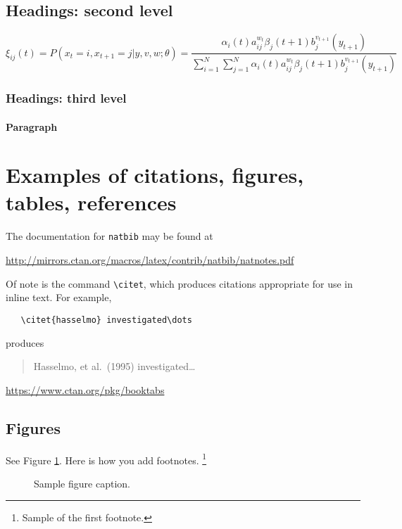 \documentclass{article}
\begin{document}
\subsection{Headings: second level}
\lipsum[5]
\begin{equation}
\xi _{ij}(t)=P(x_{t}=i,x_{t+1}=j|y,v,w;\theta)= {\frac {\alpha _{i}(t)a^{w_t}_{ij}\beta _{j}(t+1)b^{v_{t+1}}_{j}(y_{t+1})}{\sum _{i=1}^{N} \sum _{j=1}^{N} \alpha _{i}(t)a^{w_t}_{ij}\beta _{j}(t+1)b^{v_{t+1}}_{j}(y_{t+1})}}
\end{equation}

\subsubsection{Headings: third level}
\lipsum[6]

\paragraph{Paragraph}
\lipsum[7]

\section{Examples of citations, figures, tables, references}
\label{sec:others}
\lipsum[8]

The documentation for \verb+natbib+ may be found at
\begin{center}
  \url{http://mirrors.ctan.org/macros/latex/contrib/natbib/natnotes.pdf}
\end{center}
Of note is the command \verb+\citet+, which produces citations
appropriate for use in inline text.  For example,
\begin{verbatim}
   \citet{hasselmo} investigated\dots
\end{verbatim}
produces
\begin{quote}
  Hasselmo, et al.\ (1995) investigated\dots
\end{quote}

\begin{center}
  \url{https://www.ctan.org/pkg/booktabs}
\end{center}


\subsection{Figures}
\lipsum[10] 
See Figure \ref{fig:fig1}. Here is how you add footnotes. \footnote{Sample of the first footnote.}
\lipsum[11] 

\begin{figure}
  \centering
  \fbox{\rule[-.5cm]{4cm}{4cm} \rule[-.5cm]{4cm}{0cm}}
  \caption{Sample figure caption.}
  \label{fig:fig1}
\end{figure}
\end{document}
